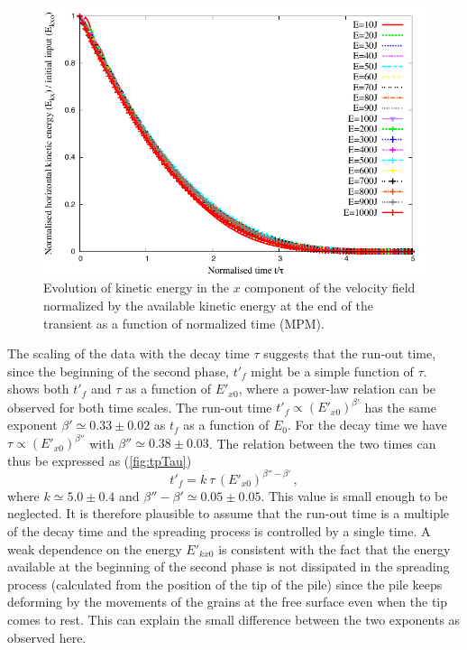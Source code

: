 \begin{figure}[tbhp]
\centering
\includegraphics[width=\textwidth]{EkxKoTTau_Slope}
\caption[Evolution of the normalised horizontal kinetic energy as function of 
the normalised time since the transient phase]{Evolution of kinetic energy in 
the $x$ component of 
the velocity field  normalized by the available kinetic energy at the end of 
the transient as a function of normalized time (MPM).}
\label{fig:ExEx0_vs_ttau}
\end{figure}


The scaling of the data with the decay time $\tau$ suggests that the 
run-out time, since the beginning of the second phase, $t'_f$ might be a simple 
function of $\tau$.~ shows both $t'_f$ and $\tau$ as 
a function of $E'_{x0}$, where a power-law relation can be observed for both 
time scales. The run-out time $t'_f \propto (E'_{x0})^{\beta'}$ has the 
same exponent $\beta' \simeq 0.33 \pm 0.02$ as $t_f$ as a function of $E_0$. 
For the decay time we have $\tau \propto (E'_{x0})^{\beta''}$ with $\beta'' 
\simeq 0.38 \pm 0.03$. The relation between the two times can thus be expressed 
as (\cref{fig:tpTau})
\begin{equation}
t'_f = k  \ \tau \, (E'_{x0})^{\beta'' - \beta'} \,,
\label{eqn:t'f}
\end{equation}
where $k \simeq 5.0 \pm 0.4$ and $\beta'' - \beta' \simeq 0.05 \pm 0.05$. This 
value is small enough to be neglected. It is therefore plausible to assume that 
the run-out time is a multiple of the decay time and the spreading process is 
controlled by a single time. A weak dependence on the energy $E'_{kx0}$ is 
consistent with the fact that the energy available at the beginning of the 
second phase is not dissipated in the spreading process (calculated from the 
position of the tip of the pile) since the pile keeps deforming by the 
movements of the grains at the free surface even when the tip comes to rest. 
This can explain the small difference between the two exponents as observed 
here.


